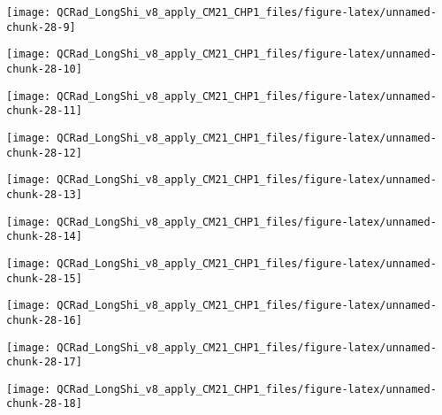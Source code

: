 \documentclass[
  10pt,
  a4paper,oneside]{article}
\begin{document}
\begin{center}\texttt{[image: QCRad\_LongShi\_v8\_apply\_CM21\_CHP1\_files/figure-latex/unnamed-chunk-28-9]} \end{center}

\begin{center}\texttt{[image: QCRad\_LongShi\_v8\_apply\_CM21\_CHP1\_files/figure-latex/unnamed-chunk-28-10]} \end{center}

\begin{center}\texttt{[image: QCRad\_LongShi\_v8\_apply\_CM21\_CHP1\_files/figure-latex/unnamed-chunk-28-11]} \end{center}

\begin{center}\texttt{[image: QCRad\_LongShi\_v8\_apply\_CM21\_CHP1\_files/figure-latex/unnamed-chunk-28-12]} \end{center}

\begin{center}\texttt{[image: QCRad\_LongShi\_v8\_apply\_CM21\_CHP1\_files/figure-latex/unnamed-chunk-28-13]} \end{center}

\begin{center}\texttt{[image: QCRad\_LongShi\_v8\_apply\_CM21\_CHP1\_files/figure-latex/unnamed-chunk-28-14]} \end{center}

\begin{center}\texttt{[image: QCRad\_LongShi\_v8\_apply\_CM21\_CHP1\_files/figure-latex/unnamed-chunk-28-15]} \end{center}

\begin{center}\texttt{[image: QCRad\_LongShi\_v8\_apply\_CM21\_CHP1\_files/figure-latex/unnamed-chunk-28-16]} \end{center}

\begin{center}\texttt{[image: QCRad\_LongShi\_v8\_apply\_CM21\_CHP1\_files/figure-latex/unnamed-chunk-28-17]} \end{center}

\begin{center}\texttt{[image: QCRad\_LongShi\_v8\_apply\_CM21\_CHP1\_files/figure-latex/unnamed-chunk-28-18]} \end{center}
\end{document}
